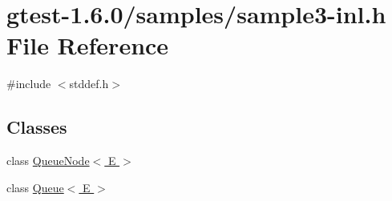 \hypertarget{sample3-inl_8h}{\section{gtest-\/1.6.0/samples/sample3-\/inl.h \-File \-Reference}
\label{db/d55/sample3-inl_8h}
}
{\ttfamily \#include $<$stddef.\-h$>$}\*
\subsection*{\-Classes}
\begin{DoxyCompactItemize}
\item 
class \hyperlink{classQueueNode}{\-Queue\-Node$<$ E $>$}
\item 
class \hyperlink{classQueue}{\-Queue$<$ E $>$}
\end{DoxyCompactItemize}
